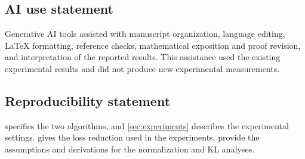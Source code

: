 \subsection*{AI use statement}
Generative AI tools assisted with manuscript organization, language editing, LaTeX formatting, reference checks, mathematical exposition and proof revision, and interpretation of the reported results. This assistance used the existing experimental results and did not produce new experimental measurements.

\subsection*{Reproducibility statement}
 specifies the two algorithms, and \cref{sec:experiments} describes the experimental settings.  gives the loss reduction used in the experiments.  provide the assumptions and derivations for the normalization and KL analyses.
